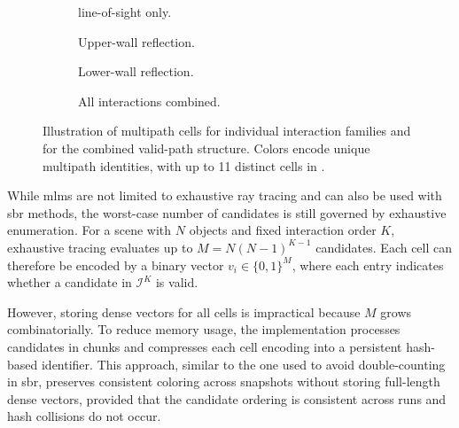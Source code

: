 \begin{figure}
  \centering
  \begin{subfigure}[t]{0.24\contentwidth}
    \centering
    \caption{\Gls{line-of-sight} only.}
  \end{subfigure}
  \hfill
  \begin{subfigure}[t]{0.24\contentwidth}
    \centering
    \caption{Upper-wall reflection.}
  \end{subfigure}
  \hfill
  \begin{subfigure}[t]{0.24\contentwidth}
    \centering
    \caption{Lower-wall reflection.}
  \end{subfigure}
  \hfill
  \begin{subfigure}[t]{0.24\contentwidth}
    \centering
    \caption{All interactions combined.}
  \end{subfigure}
  \caption{Illustration of multipath cells for individual interaction families and for the combined valid-path structure. Colors encode unique multipath identities, with up to 11 distinct cells in \protect{}.}
\end{figure}

While \glspl{mlm} are not limited to exhaustive ray tracing and can also be used with \gls{sbr} methods, the worst-case number of candidates is still governed by exhaustive enumeration. For a scene with $N$ objects and fixed interaction order $K$, exhaustive tracing evaluates up to $M = N(N-1)^{K-1}$ candidates. Each cell can therefore be encoded by a binary vector $v_i \in \{0,1\}^{M}$, where each entry indicates whether a candidate in $\mathcal{I}^K$ is valid.

However, storing dense vectors for all cells is impractical because $M$ grows combinatorially. To reduce memory usage, the implementation processes candidates in chunks and compresses each cell encoding into a persistent hash-based identifier. This approach, similar to the one used to avoid double-counting in \gls{sbr}, preserves consistent coloring across snapshots without storing full-length dense vectors, provided that the candidate ordering is consistent across runs and hash collisions do not occur.

